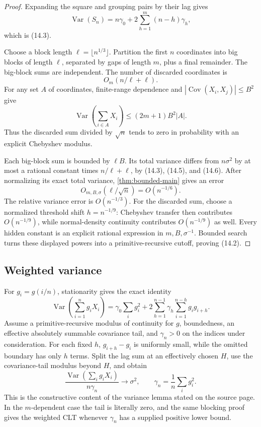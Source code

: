 \documentclass[11pt]{article}
\newcommand{\Var}{\operatorname{Var}}
\newcommand{\Cov}{\operatorname{Cov}}
\begin{document}
\begin{proof}
Expanding the square and grouping pairs by their lag gives
\[
 \Var(S_n)=n\gamma_0+2\sum_{h=1}^{m}(n-h)\gamma_h,   \tag{14.4}
\]
which is (14.3).

Choose a block length \(\ell=\lfloor n^{1/3}\rfloor\).  Partition the first
\(n\) coordinates into big blocks of length \(\ell\), separated by gaps of
length \(m\), plus a final remainder.  The big-block sums are independent.
The number of discarded coordinates is
\[
 O_m(n/\ell+\ell).                                    \tag{14.5}
\]
For any set \(A\) of coordinates, finite-range dependence and
\(|\Cov(X_i,X_j)|\le B^2\) give
\[
 \Var\!\left(\sum_{i\in A}X_i\right)
 \le(2m+1)B^2|A|.                                    \tag{14.6}
\]
Thus the discarded sum divided by \(\sqrt n\) tends to zero in probability
with an explicit Chebyshev modulus.

Each big-block sum is bounded by \(\ell B\).  Its total variance differs
from \(n\sigma^2\) by at most a rational constant times
\(n/\ell+\ell\), by (14.3), (14.5), and (14.6).  After normalizing its exact
total variance, \cref{thm:bounded-main} gives an error
\[
 O_{m,B,\sigma}(\ell/\sqrt n)=O(n^{-1/6}).            \tag{14.7}
\]
The relative variance error is \(O(n^{-1/3})\).  For the discarded sum,
choose a normalized threshold shift \(h=n^{-1/9}\): Chebyshev transfer
then contributes \(O(n^{-1/9})\), while normal-density continuity contributes
\(O(n^{-1/9})\) as well.  Every hidden constant is an explicit rational
expression in \(m,B,\sigma^{-1}\).  Bounded search turns these displayed
powers into a primitive-recursive cutoff, proving (14.2).
\end{proof}

\subsection{Weighted variance}

For \(g_i=g(i/n)\), stationarity gives the exact identity
\[
 \Var\!\left(\sum_{i=1}^ng_iX_i\right)
 =\gamma_0\sum_i g_i^2
  +2\sum_{h=1}^{n-1}\gamma_h\sum_{i=1}^{n-h}g_ig_{i+h}.                \tag{14.8}
\]
Assume a primitive-recursive modulus of continuity for \(g\), boundedness,
an effective absolutely summable covariance tail, and \(\gamma_n>0\) on the
indices under consideration.  For each fixed \(h\),
\(g_{i+h}-g_i\) is uniformly small, while the omitted boundary has only
\(h\) terms.  Split the lag sum at an effectively chosen \(H\), use the
covariance-tail modulus beyond \(H\), and obtain
\[
 \frac{\Var(\sum_i g_iX_i)}{n\gamma_n}\longrightarrow\sigma^2,
 \qquad \gamma_n=\frac1n\sum_i g_i^2.                \tag{14.9}
\]
This is the constructive content of the variance lemma stated on the source
page.  In the \(m\)-dependent case the tail is literally zero, and the same
blocking proof gives the weighted CLT whenever \(\gamma_n\) has a supplied
positive lower bound.
\end{document}
